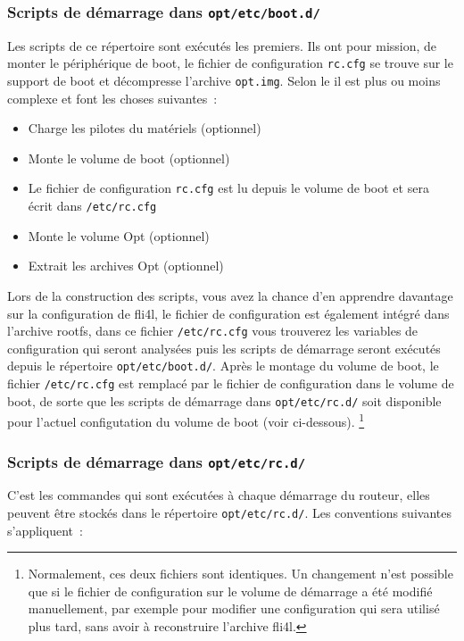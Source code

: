 \subsubsection{Scripts de démarrage dans \texttt{opt/etc/boot.d/}}

    Les scripts de ce répertoire sont exécutés les premiers. Ils ont pour mission,
	de monter le périphérique de boot, le fichier de configuration \texttt{rc.cfg}
	se trouve sur le support de boot et décompresse l'archive \texttt{opt.img}. Selon
	le  il est plus ou moins complexe et font les choses
	suivantes~:

\begin{itemize}
\item Charge les pilotes du matériels (optionnel)
\item Monte le volume de boot (optionnel)
\item Le fichier de configuration \texttt{rc.cfg} est lu depuis le volume de boot
  et sera écrit dans \texttt{/etc/rc.cfg}
\item Monte le volume Opt (optionnel)
\item Extrait les archives Opt (optionnel)
\end{itemize}

Lors de la construction des scripts, vous avez la chance d'en apprendre davantage sur
la configuration de fli4l, le fichier de configuration est également intégré dans
l'archive rootfs, dans ce fichier \texttt{/etc/rc.cfg} vous trouverez les variables
de configuration qui seront analysées puis les scripts de démarrage seront exécutés
depuis le répertoire \texttt{opt/etc/boot.d/}. Après le montage du volume de boot,
le fichier \texttt{/etc/rc.cfg} est remplacé par le fichier de configuration dans le
volume de boot, de sorte que les scripts de démarrage dans \texttt{opt/etc/rc.d/} soit
disponible pour l'actuel configutation du volume de boot (voir ci-dessous).
\footnote{Normalement, ces deux fichiers sont identiques. Un changement n'est possible
que si le fichier de configuration sur le volume de démarrage a été modifié manuellement,
par exemple pour modifier une configuration qui sera utilisé plus tard, sans avoir à
reconstruire l'archive fli4l.}


\subsubsection{Scripts de démarrage dans \texttt{opt/etc/rc.d/}}

    C'est les commandes qui sont exécutées à chaque démarrage du routeur, elles peuvent
	être stockés dans le répertoire \texttt{opt/etc/rc.d/}. Les conventions suivantes
	s'appliquent~:

